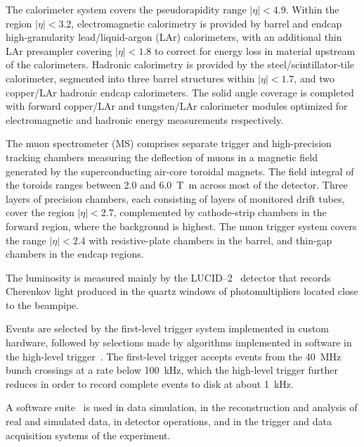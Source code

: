 The calorimeter system covers the pseudorapidity range \(|\eta| < 4.9\).
Within the region \(|\eta|< 3.2\), electromagnetic calorimetry is provided by barrel and 
endcap high-granularity lead/liquid-argon (LAr) calorimeters,
with an additional thin LAr presampler covering \(|\eta| < 1.8\)
to correct for energy loss in material upstream of the calorimeters.
Hadronic calorimetry is provided by the steel/scintillator-tile calorimeter,
segmented into three barrel structures within \(|\eta| < 1.7\), and two copper/LAr hadronic endcap calorimeters.
The solid angle coverage is completed with forward copper/LAr and tungsten/LAr calorimeter modules
optimized for electromagnetic and hadronic energy measurements respectively.

The muon spectrometer (MS) comprises separate trigger and
high-precision tracking chambers measuring the deflection of muons in a magnetic field generated by the superconducting air-core toroidal magnets.
The field integral of the toroids ranges between \num{2.0} and \SI{6.0}{\tesla\metre}
across most of the detector. 
Three layers of precision chambers, each consisting of layers of monitored drift tubes, cover the region \(|\eta| < 2.7\),
complemented by cathode-strip chambers in the forward region, where the background is highest.
The muon trigger system covers the range \(|\eta| < 2.4\) with resistive-plate chambers in the barrel, and thin-gap chambers in the endcap regions.

The luminosity is measured mainly by the LUCID--2~\cite{LUCID2} detector that records Cherenkov light produced in the quartz windows of photomultipliers located close to the beampipe.

Events are selected by the first-level trigger system implemented in custom hardware,
followed by selections made by algorithms implemented in software in the high-level trigger~\cite{TRIG-2016-01}. 
The first-level trigger accepts events from the \SI{40}{\MHz} bunch crossings at a rate below \SI{100}{\kHz},
which the high-level trigger further reduces in order to record complete events to disk at about \SI{1}{\kHz}.

A software suite~\cite{SOFT-2022-02} is used in data simulation, in the reconstruction
and analysis of real and simulated data, in detector operations, and in the trigger and data acquisition
systems of the experiment.
